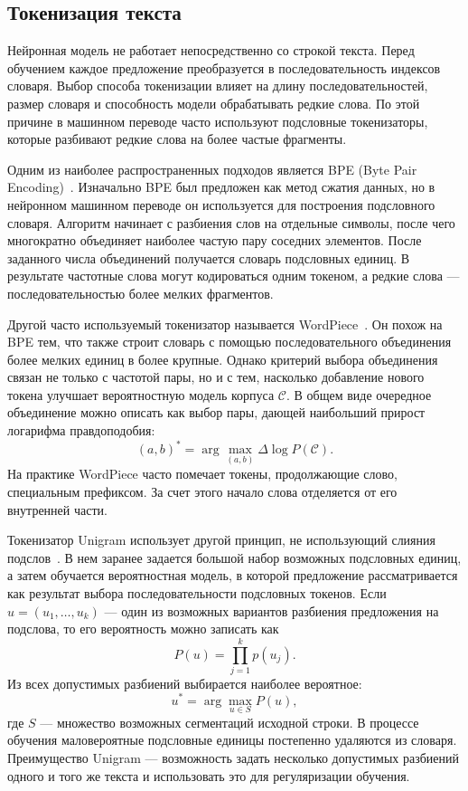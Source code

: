 \subsection{Токенизация текста}

Нейронная модель не работает непосредственно со строкой текста.
Перед обучением каждое предложение преобразуется в последовательность индексов словаря.
Выбор способа токенизации влияет на длину последовательностей, размер словаря и способность модели обрабатывать редкие слова.
По этой причине в машинном переводе часто используют подсловные токенизаторы, которые разбивают редкие слова на более частые фрагменты.

Одним из наиболее распространенных подходов является BPE (Byte Pair Encoding)~\cite{bpe}.
Изначально BPE был предложен как метод сжатия данных, но в нейронном машинном переводе он используется для построения подсловного словаря.
Алгоритм начинает с разбиения слов на отдельные символы, после чего многократно объединяет наиболее частую пару соседних элементов.
После заданного числа объединений получается словарь подсловных единиц.
В результате частотные слова могут кодироваться одним токеном, а редкие слова --- последовательностью более мелких фрагментов.

Другой часто используемый токенизатор называется WordPiece~\cite{wordpiece}.
Он похож на BPE тем, что также строит словарь с помощью последовательного объединения более мелких единиц в более крупные.
Однако критерий выбора объединения связан не только с частотой пары, но и с тем, насколько добавление нового токена улучшает вероятностную модель корпуса $\mathcal{C}$.
В общем виде очередное объединение можно описать как выбор пары, дающей наибольший прирост логарифма правдоподобия:
\[
	(a, b)^* = \arg\max_{(a,b)} \Delta \log P(\mathcal{C}).
\]
На практике WordPiece часто помечает токены, продолжающие слово, специальным префиксом.
За счет этого начало слова отделяется от его внутренней части.

Токенизатор Unigram использует другой принцип, не использующий слияния подслов~\cite{unigram}.
В нем заранее задается большой набор возможных подсловных единиц, а затем обучается вероятностная модель, в которой предложение рассматривается как результат выбора последовательности подсловных токенов.
Если $u = (u_1, \ldots, u_k)$ --- один из возможных вариантов разбиения предложения на подслова, то его вероятность можно записать как
\[
	P(u) = \prod_{j=1}^{k} p(u_j).
\]
Из всех допустимых разбиений выбирается наиболее вероятное:
\[
	u^* = \arg\max_{u \in S} P(u),
\]
где $S$ --- множество возможных сегментаций исходной строки.
В процессе обучения маловероятные подсловные единицы постепенно удаляются из словаря.
Преимущество Unigram --- возможность задать несколько допустимых разбиений одного и того же текста и использовать это для регуляризации обучения.

